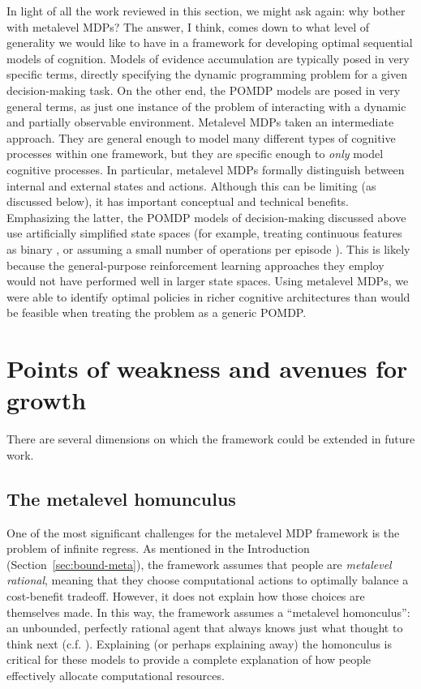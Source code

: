 In light of all the work reviewed in this section, we might ask again: why bother with metalevel MDPs? The answer, I think, comes down to what level of generality we would like to have in a framework for developing optimal sequential models of cognition. Models of evidence accumulation are typically posed in very specific terms, directly specifying the dynamic programming problem for a given decision-making task. On the other end, the POMDP models are posed in very general terms, as just one instance of the problem of interacting with a dynamic and partially observable environment. Metalevel MDPs taken an intermediate approach. They are general enough to model many different types of cognitive processes within one framework, but they are specific enough to \emph{only} model cognitive processes. In particular, metalevel MDPs formally distinguish between internal and external states and actions. Although this can be limiting (as discussed below), it has important conceptual and technical benefits. Emphasizing the latter, the POMDP models of decision-making discussed above use artificially simplified state spaces (for example, treating continuous features as binary \citealp{chen2017cognitive}, or assuming a small number of operations per episode \citealp{chen2021apparently}). This is likely because the general-purpose reinforcement learning approaches they employ would not have performed well in larger state spaces. Using metalevel MDPs, we were able to identify optimal policies in richer cognitive architectures than would be feasible when treating the problem as a generic POMDP.

\section{Points of weakness and avenues for growth}

There are several dimensions on which the framework could be extended in future work.

\subsection{The metalevel homunculus}

One of the most significant challenges for the metalevel MDP framework is the problem of infinite regress. As mentioned in the Introduction (Section~\ref{sec:bound-meta}), the framework assumes that people are \emph{metalevel rational}, meaning that they choose computational actions to optimally balance a cost-benefit tradeoff. However, it does not explain how those choices are themselves made. In this way, the framework assumes a ``metalevel homonculus'': an unbounded, perfectly rational agent that always knows just what thought to think next (c.f. \citealp{hazy2006banishing,botvinick2014computational}). Explaining (or perhaps explaining away) the homonculus is critical for these models to provide a complete explanation of how people effectively allocate computational resources.

